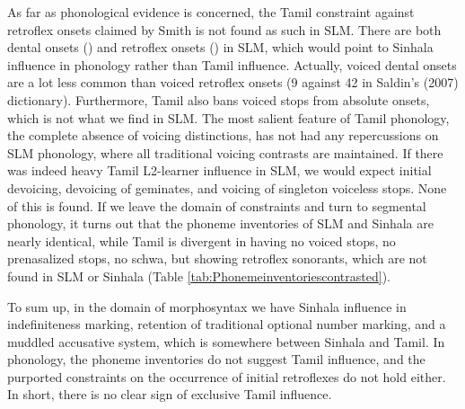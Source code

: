 As far as phonological evidence is concerned, the Tamil constraint against retroflex onsets claimed by Smith is not found as such in SLM. There are both dental onsets () and retroflex onsets () in SLM, which would point  to Sinhala influence in phonology rather than Tamil influence. Actually, voiced dental onsets are a lot less common than voiced retroflex onsets (9 against 42 in Saldin's (2007) dictionary\nocite{Saldin2007Dico}). Furthermore,  Tamil also bans voiced stops from absolute onsets, which is not what we find in SLM. The most salient feature of Tamil phonology, the complete absence of voicing distinctions, has not had any repercussions on SLM phonology, where all traditional voicing contrasts are maintained. If there was indeed heavy Tamil L2-learner influence in SLM, we would expect initial devoicing, devoicing of geminates, and voicing of singleton voiceless stops. None of this is found. If we leave the domain of constraints and turn to segmental phonology, it turns out that the phoneme inventories of SLM and Sinhala are nearly identical, while Tamil is divergent in having no voiced stops, no prenasalized stops, no schwa, but showing retroflex sonorants, which are not found in SLM or Sinhala (Table \ref{tab:Phonemeinventoriescontrasted}).


To sum up, in the domain of morphosyntax we have Sinhala influence in  indefiniteness marking, retention of traditional optional number marking, and a muddled accusative system, which is somewhere between Sinhala and Tamil. In phonology, the phoneme inventories do not suggest Tamil influence, and the purported constraints on the occurrence of initial retroflexes do not hold either. In short, there is no clear sign of exclusive Tamil influence.

